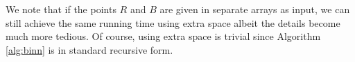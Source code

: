 We note that if the points $R$ and $B$ are given in separate arrays as input, we can still achieve the same running time using  extra space albeit the 
details become much more tedious. Of course, using  extra space is trivial since Algorithm \ref{alg:binn} is in standard recursive form.
%
%
%
%
%
